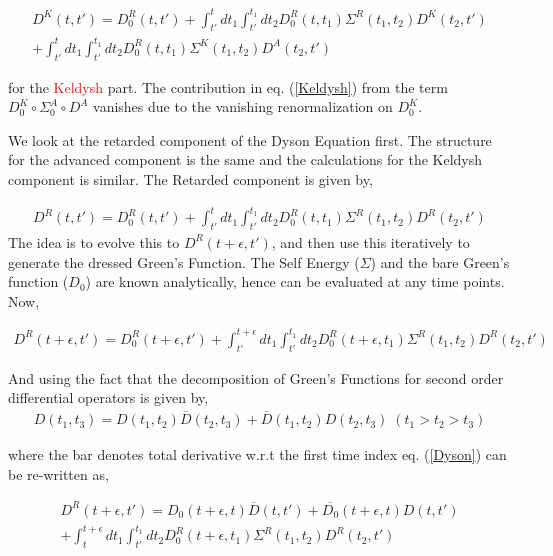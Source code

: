 \documentclass{amsart}
\begin{document}
    \begin{multline}\label{Keldysh}
        D^K(t , t') = D_0^R(t, t')  + \int^t_{t'} dt_1\int^{t_1}_{t'} dt_2 D_0^R(t, t_1) \Sigma^R (t_1,t_2) D^K(t_2, t') \\
                                    + \int^t_{t'} dt_1\int^{t_1}_{t'} dt_2 D_0^R(t, t_1) \Sigma^K (t_1,t_2) D^A(t_2, t') 
    \end{multline}
   
   \par for the \textcolor{red}{Keldysh} part. The contribution in eq. (\ref{Keldysh}) from the term $D_0^K\circ \Sigma_0^A\circ D^A$ vanishes due to the vanishing renormalization on $D_0^K$.
    
    
    We look at the retarded component of the Dyson Equation first. The structure for the advanced component is the same and the calculations for the Keldysh component is similar. The Retarded component is given by,

    \begin{align}
        D^R(t , t') = D_0^R(t, t') + \int^t_{t'} dt_1\int^{t_1}_{t'} dt_2 D_0^R(t, t_1) \Sigma^R (t_1,t_2) D^R(t_2, t')
    \end{align}
     The idea is to evolve this to $D^R(t+\epsilon , t')$, and then use this iteratively to generate the dressed Green's Function. The Self Energy ($\Sigma$) and the bare Green's function ($D_0$) are known analytically, hence can be evaluated at any time points. Now,  
     
    \begin{align}\label{Dyson}
        D^R(t+\epsilon , t') = D_0^R(t+\epsilon, t') + \int^{t+\epsilon}_{t'} dt_1\int^{t_1}_{t'} dt_2 D_0^R(t+\epsilon, t_1) \Sigma^R (t_1,t_2) D^R(t_2, t')
    \end{align}
    
    And using the fact that the decomposition of Green's Functions for second order differential operators is given by,
    \begin{align}
        D(t_1 , t_3)=D(t_1 , t_2)\overline{D}(t_2 , t_3)+\overline{D}(t_1 , t_2)D(t_2 , t_3) \; (t_1>t_2>t_3)
    \end{align}
    
    where the bar denotes total derivative w.r.t the first time index eq. (\ref{Dyson}) can be re-written as,
    
    \par 
    \begin{multline}\label{DysonReduced}
        D^R(t+\epsilon , t') = D_0(t+\epsilon , t)\overline{D}(t , t')+\overline{D_0}(t+\epsilon , t)D(t , t')
        \\ + \int^{t+\epsilon}_{t} dt_1\int^{t_1}_{t'} dt_2 D_0^R(t+\epsilon, t_1) \Sigma^R (t_1,t_2) D^R(t_2, t')
    \end{multline}
        
\end{document}
